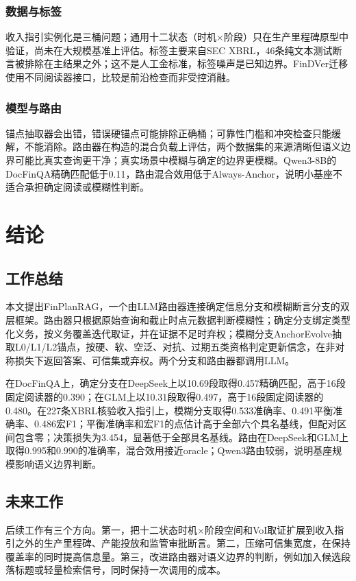 \subsection{数据与标签}

收入指引实例化是三桶问题；通用十二状态（时机×阶段）只在生产里程碑原型中验证，尚未在大规模基准上评估。标签主要来自SEC XBRL，46条纯文本测试断言被排除在主结果之外；这不是人工金标准，标签噪声是已知边界。FinDVer迁移使用不同阅读器接口，比较是前沿检查而非受控消融。

\subsection{模型与路由}

锚点抽取器会出错，错误硬锚点可能排除正确桶；可靠性门槛和冲突检查只能缓解，不能消除。路由器在构造的混合负载上评估，两个数据集的来源清晰但语义边界可能比真实查询更干净；真实场景中模糊与确定的边界更模糊。Qwen3-8B的DocFinQA精确匹配低于0.11，路由混合效用低于Always-Anchor，说明小基座不适合承担确定阅读或模糊性判断。

\chapter{结论}
\label{ch:conclusion}

\section{工作总结}

本文提出FinPlanRAG，一个由LLM路由器连接确定信息分支和模糊断言分支的双层框架。路由器只根据原始查询和截止时点元数据判断模糊性；确定分支绑定类型化义务，按义务覆盖迭代取证，并在证据不足时弃权；模糊分支AnchorEvolve抽取L0/L1/L2锚点，按硬、软、空泛、对抗、过期五类资格判定更新信念，在非对称损失下返回答案、可信集或弃权。两个分支和路由器都调用LLM。

在DocFinQA上，确定分支在DeepSeek上以10.69段取得0.457精确匹配，高于16段固定阅读器的0.390；在GLM上以10.31段取得0.497，高于16段固定阅读器的0.480。在227条XBRL核验收入指引上，模糊分支取得0.533准确率、0.491平衡准确率、0.486宏F1；平衡准确率和宏F1的点估计高于全部六个具名基线，但配对区间包含零；决策损失为3.454，显著低于全部具名基线。路由在DeepSeek和GLM上取得0.995和0.990的准确率，混合效用接近oracle；Qwen3路由较弱，说明基座规模影响语义边界判断。

\section{未来工作}

后续工作有三个方向。第一，把十二状态时机×阶段空间和VoI取证扩展到收入指引之外的生产里程碑、产能投放和监管审批断言。第二，压缩可信集宽度，在保持覆盖率的同时提高信息量。第三，改进路由器对语义边界的判断，例如加入候选段落标题或轻量检索信号，同时保持一次调用的成本。
